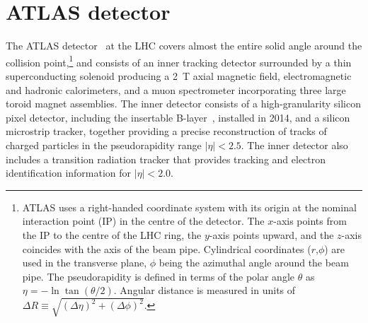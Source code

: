 \section{ATLAS detector}
\label{sec:detector}

The ATLAS detector~\cite{PERF-2007-01} at the LHC covers almost the entire solid angle around the collision point,\footnote{ATLAS 
uses a right-handed coordinate system with its origin at the nominal interaction point (IP) in the 
centre of the detector.  
The $x$-axis points from
the IP to the centre of the LHC ring, %
the $y$-axis points upward,
and the $z$-axis coincides with the axis of the beam pipe.
Cylindrical coordinates ($r$,$\phi$) are used 
in the transverse plane, $\phi$ being the azimuthal angle around the beam pipe. The pseudorapidity is defined in 
terms of the polar angle $\theta$ as $\eta = - \ln \tan(\theta/2)$.
Angular distance is measured in units of $\Delta R\equiv \sqrt{(\Delta\eta)^2+(\Delta\phi)^2}$.} and
consists of an inner tracking detector surrounded by a thin superconducting solenoid producing a
2~T axial magnetic field, electromagnetic and hadronic calorimeters, and a muon spectrometer
incorporating three large toroid magnet assemblies. The inner detector consists of a high-granularity silicon pixel detector, 
including the %
insertable B-layer~\cite{IBL}, installed in 2014,
and a silicon microstrip tracker,
together providing a precise reconstruction of tracks of charged particles in the pseudorapidity range $|\eta|<2.5$.
The inner detector also includes a transition radiation tracker that provides tracking and electron identification information for $|\eta|<2.0$.
